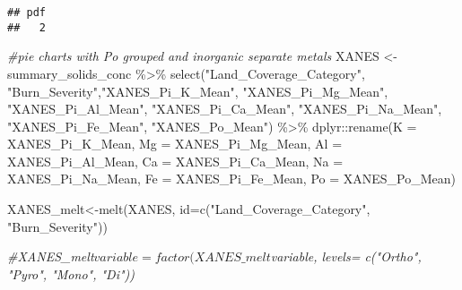 \documentclass[
]{article}
\newenvironment{Shaded}{\begin{snugshade}}{\end{snugshade}}
\newcommand{\AttributeTok}[1]{\textcolor[rgb]{0.77,0.63,0.00}{#1}}
\newcommand{\CommentTok}[1]{\textcolor[rgb]{0.56,0.35,0.01}{\textit{#1}}}
\newcommand{\FunctionTok}[1]{\textcolor[rgb]{0.00,0.00,0.00}{#1}}
\newcommand{\NormalTok}[1]{#1}
\newcommand{\OtherTok}[1]{\textcolor[rgb]{0.56,0.35,0.01}{#1}}
\newcommand{\SpecialCharTok}[1]{\textcolor[rgb]{0.00,0.00,0.00}{#1}}
\newcommand{\StringTok}[1]{\textcolor[rgb]{0.31,0.60,0.02}{#1}}
\begin{document}
\begin{verbatim}
## pdf 
##   2
\end{verbatim}

\begin{Shaded}
\begin{Highlighting}[]
\CommentTok{\#pie charts with Po grouped and inorganic separate metals}
\NormalTok{XANES }\OtherTok{\textless{}{-}}\NormalTok{ summary\_solids\_conc }\SpecialCharTok{\%\textgreater{}\%}
  \FunctionTok{select}\NormalTok{(}\StringTok{"Land\_Coverage\_Category"}\NormalTok{, }\StringTok{"Burn\_Severity"}\NormalTok{,}\StringTok{"XANES\_Pi\_K\_Mean"}\NormalTok{, }\StringTok{"XANES\_Pi\_Mg\_Mean"}\NormalTok{, }\StringTok{"XANES\_Pi\_Al\_Mean"}\NormalTok{, }\StringTok{"XANES\_Pi\_Ca\_Mean"}\NormalTok{, }\StringTok{"XANES\_Pi\_Na\_Mean"}\NormalTok{, }\StringTok{"XANES\_Pi\_Fe\_Mean"}\NormalTok{, }\StringTok{"XANES\_Po\_Mean"}\NormalTok{) }\SpecialCharTok{\%\textgreater{}\%}
\NormalTok{  dplyr}\SpecialCharTok{::}\FunctionTok{rename}\NormalTok{(}\AttributeTok{K =}\NormalTok{ XANES\_Pi\_K\_Mean,}
                \AttributeTok{Mg =}\NormalTok{ XANES\_Pi\_Mg\_Mean,}
                \AttributeTok{Al =}\NormalTok{ XANES\_Pi\_Al\_Mean,}
                \AttributeTok{Ca =}\NormalTok{ XANES\_Pi\_Ca\_Mean,}
                \AttributeTok{Na =}\NormalTok{ XANES\_Pi\_Na\_Mean,}
                \AttributeTok{Fe =}\NormalTok{ XANES\_Pi\_Fe\_Mean,}
                \AttributeTok{Po =}\NormalTok{ XANES\_Po\_Mean)}

\NormalTok{XANES\_melt}\OtherTok{\textless{}{-}}\FunctionTok{melt}\NormalTok{(XANES, }\AttributeTok{id=}\FunctionTok{c}\NormalTok{(}\StringTok{"Land\_Coverage\_Category"}\NormalTok{, }\StringTok{"Burn\_Severity"}\NormalTok{))}

\CommentTok{\#XANES\_melt$variable=factor(XANES\_melt$variable, levels= c("Ortho", "Pyro", "Mono", "Di"))}


\end{Highlighting}
\end{Shaded}
\end{document}
